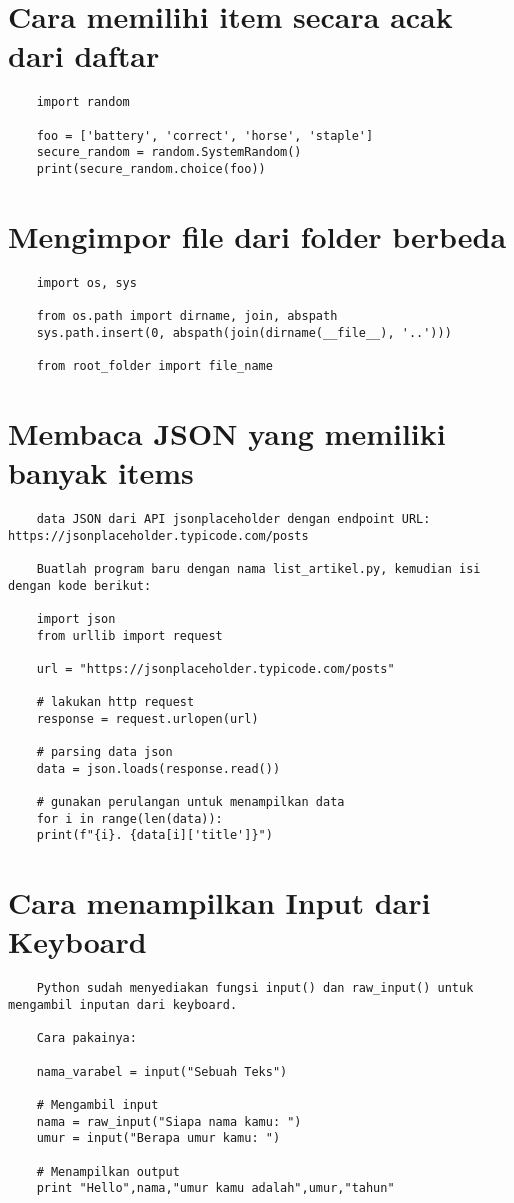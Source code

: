 \documentclass{article}
\begin{document}
\section{Cara memilihi item secara acak dari daftar}
\begin{lstlisting}
	import random
	
	foo = ['battery', 'correct', 'horse', 'staple']
	secure_random = random.SystemRandom()
	print(secure_random.choice(foo))
\end{lstlisting}

\section{Mengimpor file dari folder berbeda}
\begin{lstlisting}
	import os, sys
	
	from os.path import dirname, join, abspath
	sys.path.insert(0, abspath(join(dirname(__file__), '..')))
	
	from root_folder import file_name
\end{lstlisting}

\section{Membaca JSON yang memiliki banyak items}
\begin{lstlisting}
	data JSON dari API jsonplaceholder dengan endpoint URL: https://jsonplaceholder.typicode.com/posts
	
	Buatlah program baru dengan nama list_artikel.py, kemudian isi dengan kode berikut:
	
	import json
	from urllib import request
	
	url = "https://jsonplaceholder.typicode.com/posts"
	
	# lakukan http request
	response = request.urlopen(url)
	
	# parsing data json
	data = json.loads(response.read())
	
	# gunakan perulangan untuk menampilkan data
	for i in range(len(data)):
	print(f"{i}. {data[i]['title']}")
\end{lstlisting}

\section{Cara menampilkan Input dari Keyboard}
\begin{lstlisting}
	Python sudah menyediakan fungsi input() dan raw_input() untuk mengambil inputan dari keyboard.
	
	Cara pakainya:
	
	nama_varabel = input("Sebuah Teks")
	
	# Mengambil input
	nama = raw_input("Siapa nama kamu: ")
	umur = input("Berapa umur kamu: ")
	
	# Menampilkan output
	print "Hello",nama,"umur kamu adalah",umur,"tahun"
\end{lstlisting}
\end{document}
